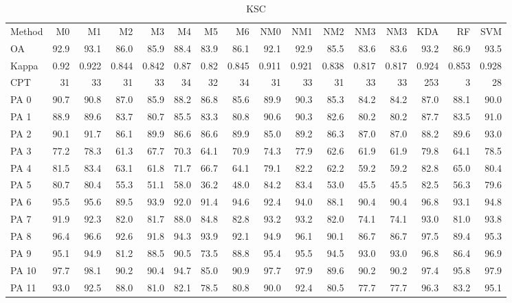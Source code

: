 \documentclass[a4paper,10pt,DIV=16]{scrartcl}
\begin{document}
\begin{table}[h]
  \footnotesize
  \centering
  \caption{KSC}
  \begin{tabular}{lrrrrrrrrrrrrrrr}
    Method & M0 & M1 & M2 & M3 & M4 & M5 & M6 & NM0 & NM1 & NM2 & NM3 & NM3 & KDA & RF & SVM \\
    OA & 92.9 & 93.1 & 86.0 & 85.9 & 88.4 & 83.9 & 86.1 & 92.1 & 92.9 & 85.5 & 83.6 & 83.6 & 93.2 & 86.9 & 93.5 \\
    Kappa & 0.92 & 0.922 & 0.844 & 0.842 & 0.87 & 0.82 & 0.845 & 0.911 & 0.921 & 0.838 & 0.817 & 0.817 & 0.924 & 0.853 & 0.928 \\
    CPT & 31 & 33 & 31 & 33 & 34 & 32 & 34 & 31 & 33 & 31 & 33 & 33 & 253 & 3 & 28 \\
    PA 0 & 90.7 & 90.8 & 87.0 & 85.9 & 88.2 & 86.8 & 85.6 & 89.9 & 90.3 & 85.3 & 84.2 & 84.2 & 87.0 & 88.1 & 90.0 \\
    PA 1 & 88.9 & 89.6 & 83.7 & 80.7 & 85.5 & 83.3 & 80.8 & 90.6 & 90.3 & 82.6 & 80.2 & 80.2 & 87.7 & 83.5 & 91.0 \\
    PA 2 & 90.1 & 91.7 & 86.1 & 89.9 & 86.6 & 86.6 & 89.9 & 85.0 & 89.2 & 86.3 & 87.0 & 87.0 & 88.2 & 89.6 & 93.0 \\
    PA 3 & 77.2 & 78.3 & 61.3 & 67.7 & 70.3 & 64.1 & 70.9 & 74.3 & 77.9 & 62.6 & 61.9 & 61.9 & 79.8 & 64.1 & 78.5 \\
    PA 4 & 81.5 & 83.4 & 63.1 & 61.8 & 71.7 & 66.7 & 64.1 & 79.1 & 82.2 & 62.2 & 59.2 & 59.2 & 82.8 & 65.0 & 80.4 \\
    PA 5 & 80.7 & 80.4 & 55.3 & 51.1 & 58.0 & 36.2 & 48.0 & 84.2 & 83.4 & 53.0 & 45.5 & 45.5 & 82.5 & 56.3 & 79.6 \\
    PA 6 & 95.5 & 95.6 & 89.5 & 93.9 & 92.0 & 91.4 & 94.6 & 92.4 & 94.0 & 88.1 & 90.4 & 90.4 & 96.8 & 93.1 & 94.8 \\
    PA 7 & 91.9 & 92.3 & 82.0 & 81.7 & 88.0 & 84.8 & 82.8 & 93.2 & 93.2 & 82.0 & 74.1 & 74.1 & 93.0 & 81.0 & 93.8 \\
    PA 8 & 96.4 & 96.6 & 92.6 & 91.8 & 94.3 & 93.9 & 92.1 & 94.9 & 96.1 & 90.1 & 86.7 & 86.7 & 97.5 & 89.4 & 95.3 \\
    PA 9 & 95.1 & 94.9 & 81.2 & 88.5 & 90.5 & 73.5 & 88.8 & 95.4 & 95.5 & 94.5 & 93.0 & 93.0 & 96.8 & 86.4 & 96.9 \\
    PA 10 & 97.7 & 98.1 & 90.2 & 90.4 & 94.7 & 85.0 & 90.9 & 97.7 & 97.9 & 89.6 & 90.2 & 90.2 & 97.4 & 95.8 & 97.9 \\
    PA 11 & 93.0 & 92.5 & 88.0 & 81.0 & 82.1 & 78.5 & 80.8 & 90.0 & 92.4 & 80.5 & 77.7 & 77.7 & 96.3 & 83.2 & 95.1 \\

\end{tabular}
\end{table}
\end{document}
